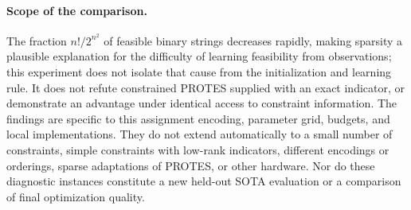 \paragraph{Scope of the comparison.}
The fraction $n!/2^{n^2}$ of feasible binary strings decreases rapidly,
making sparsity a plausible explanation for the difficulty of learning
feasibility from observations; this experiment does not isolate that cause
from the initialization and learning rule. It does not refute constrained
PROTES supplied with an exact indicator, or demonstrate an advantage under
identical access to constraint information. The findings are specific to
this assignment encoding, parameter grid, budgets, and local implementations.
They do not extend automatically to a small number of constraints, simple
constraints with low-rank indicators, different encodings or orderings,
sparse adaptations of PROTES, or other hardware. Nor do these diagnostic
instances constitute a new held-out SOTA evaluation or a comparison of
final optimization quality.
\clearpage
